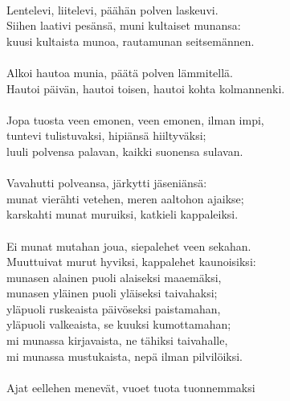                                                            \\
Lentelevi, liitelevi, päähän polven laskeuvi.               \\
Siihen laativi pesänsä, muni kultaiset munansa:             \\
kuusi kultaista munoa, rautamunan seitsemännen.             \\
                                                            \\
Alkoi hautoa munia, päätä polven lämmitellä.                \\
Hautoi päivän, hautoi toisen, hautoi kohta kolmannenki.     \\
                                                            \\
Jopa tuosta veen emonen, veen emonen, ilman impi,           \\
tuntevi tulistuvaksi, hipiänsä hiiltyväksi;                 \\
luuli polvensa palavan, kaikki suonensa sulavan.            \\
                                                            \\
Vavahutti polveansa, järkytti jäseniänsä:                   \\
munat vierähti vetehen, meren aaltohon ajaikse;             \\
karskahti munat muruiksi, katkieli kappaleiksi.             \\
                                                            \\
Ei munat mutahan joua, siepalehet veen sekahan.             \\
Muuttuivat murut hyviksi, kappalehet kaunoisiksi:           \\
munasen alainen puoli alaiseksi maaemäksi,                  \\
munasen yläinen puoli yläiseksi taivahaksi;                 \\
yläpuoli ruskeaista päivöseksi paistamahan,                 \\
yläpuoli valkeaista, se kuuksi kumottamahan;                \\
mi munassa kirjavaista, ne tähiksi taivahalle,              \\
mi munassa mustukaista, nepä ilman pilvilöiksi.             \\
                                                            \\
Ajat eellehen menevät, vuoet tuota tuonnemmaksi             \\
